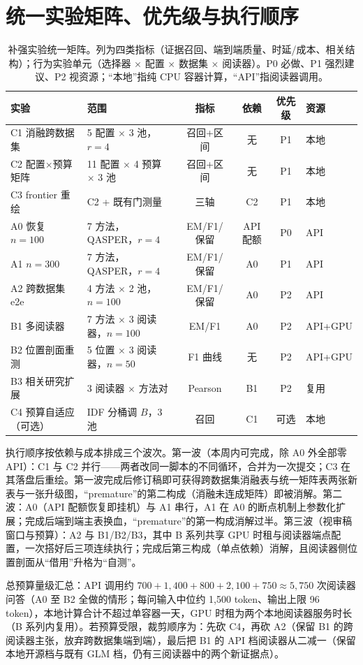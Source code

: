 \section{统一实验矩阵、优先级与执行顺序}

\begin{table}[htbp]
\centering
\caption{补强实验统一矩阵。列为四类指标（证据召回、端到端质量、时延/成本、相关结构）；行为实验单元（选择器 $\times$ 配置 $\times$ 数据集 $\times$ 阅读器）。P0 必做、P1 强烈建议、P2 视资源；``本地''指纯 CPU 容器计算，``API''指阅读器调用。}
\label{tab:matrix}
\small
\begin{tabularx}{\textwidth}{@{}lXcccl@{}}
\toprule
实验 & 范围 & 指标 & 依赖 & 优先级 & 资源 \\
\midrule
C1 消融跨数据集 & 5 配置 $\times$ 3 池，$r{=}4$ & 召回+区间 & 无 & P1 & 本地 \\
C2 配置$\times$预算矩阵 & 11 配置 $\times$ 4 预算 $\times$ 3 池 & 召回+区间 & 无 & P1 & 本地 \\
C3 frontier 重绘 & C2 + 既有门测量 & 三轴 & C2 & P1 & 本地 \\
A0 恢复 $n{=}100$ & 7 方法，QASPER，$r{=}4$ & EM/F1/保留 & API 配额 & P0 & API \\
A1 $n{=}300$ & 7 方法，QASPER，$r{=}4$ & EM/F1/保留 & A0 & P1 & API \\
A2 跨数据集 e2e & 4 方法 $\times$ 2 池，$n{=}100$ & EM/F1/保留 & A0 & P2 & API \\
B1 多阅读器 & 7 方法 $\times$ 3 阅读器，$n{=}100$ & EM/F1 & A0 & P2 & API+GPU \\
B2 位置剖面重测 & 5 位置 $\times$ 3 阅读器，$n{=}50$ & F1 曲线 & 无 & P2 & API+GPU \\
B3 相关研究扩展 & 3 阅读器 $\times$ 方法对 & Pearson & B1 & P2 & 复用 \\
C4 预算自适应（可选） & IDF 分桶调 $B$，3 池 & 召回 & C1 & 可选 & 本地 \\
\bottomrule
\end{tabularx}
\end{table}

执行顺序按依赖与成本排成三个波次。第一波（本周内可完成，除 A0 外全部零 API）：C1 与 C2 并行——两者改同一脚本的不同循环，合并为一次提交；C3 在其落盘后重绘。第一波完成后修订稿即可获得跨数据集消融表与统一矩阵表两张新表与一张升级图，``premature''的第二构成（消融未连成矩阵）即被消解。第二波：A0（API 配额恢复即挂机）与 A1 串行，A1 在 A0 的断点机制上参数化扩展；完成后端到端主表换血，``premature''的第一构成消解过半。第三波（视审稿窗口与预算）：A2 与 B1/B2/B3，其中 B 系列共享 GPU 时租与阅读器端点配置，一次搭好后三项连续执行；完成后第三构成（单点依赖）消解，且阅读器侧位置剖面从``借用''升格为``自测''。

总预算量级汇总：API 调用约 $700+1{,}400+800+2{,}100+750\approx 5{,}750$ 次阅读器问答（A0 至 B2 全做的情形；每问输入中位约 1{,}500 token、输出上限 96 token），本地计算合计不超过单容器一天，GPU 时租为两个本地阅读器服务时长（B 系列内复用）。若预算受限，裁剪顺序为：先砍 C4，再砍 A2（保留 B1 的跨阅读器主张，放弃跨数据集端到端），最后把 B1 的 API 档阅读器从二减一（保留本地开源档与既有 GLM 档，仍有三阅读器中的两个新证据点）。
